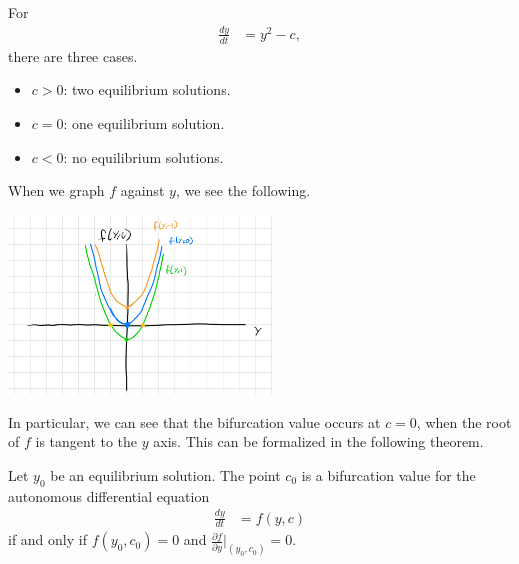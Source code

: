 \documentclass[10pt]{mypackage}
\begin{document}
\begin{recall}
For
\begin{align*}
  \frac{dy}{dt} &= y^2 - c,
\end{align*}
there are three cases.
\begin{itemize}
  \item $c > 0$: two equilibrium solutions.
  \item $c = 0$: one equilibrium solution.
  \item $c < 0$: no equilibrium solutions.
\end{itemize}
When we graph $f$ against $y$, we see the following.
\begin{center}
  \includegraphics[width=7cm]{images/graph_to_bifurcation.png}
\end{center}
In particular, we can see that the bifurcation value occurs at $c = 0$, when the root of $f$ is tangent to the $y$ axis. This can be formalized in the following theorem.
\end{recall}
\begin{theorem}
  Let $y_0$ be an equilibrium solution. The point $c_0$ is a bifurcation value for the autonomous differential equation
  \begin{align*}
    \frac{dy}{dt} &= f(y,c)
  \end{align*}
  if and only if $f(y_0,c_0) = 0$ and $\frac{\partial f}{\partial y}\bigr\vert_{(y_0,c_0)} = 0$.
\end{theorem}
\end{document}

